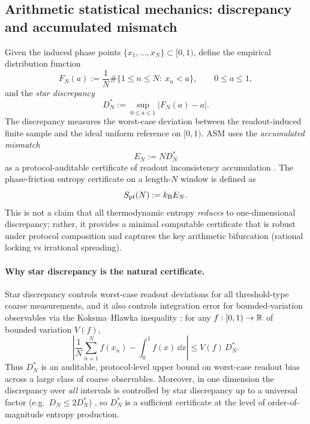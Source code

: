 \subsection{Arithmetic statistical mechanics: discrepancy and accumulated mismatch}
\label{sec:asm_discrepancy}

Given the induced phase points $\{x_1,\dots,x_N\}\subset[0,1)$, define the empirical distribution function
\begin{equation}
  F_N(a) := \frac{1}{N}\#\{1\le n\le N:\ x_n<a\},
  \qquad 0\le a\le 1,
\end{equation}
and the \emph{star discrepancy}
\begin{equation}
  D_N^\ast := \sup_{0\le a\le 1}\bigl|F_N(a)-a\bigr|.
  \label{eq:star_discrepancy_def}
\end{equation}
The discrepancy measures the worst-case deviation between the readout-induced finite sample and the ideal uniform reference on $[0,1)$.
ASM uses the \emph{accumulated mismatch}
\begin{equation}
  E_N := N D_N^\ast
  \label{eq:EN_def}
\end{equation}
as a protocol-auditable certificate of readout inconsistency accumulation \cite{KuipersNiederreiter1974,DrmotaTichy1997,Ma2025HPT}.
The phase-friction entropy certificate on a length-$N$ window is defined as
\begin{equation}
  S_{\mathrm{pf}}(N) := k_{\mathrm{B}} E_N.
  \label{eq:Spf_def}
\end{equation}
This is not a claim that all thermodynamic entropy \emph{reduces} to one-dimensional discrepancy; rather, it provides a minimal computable certificate that is robust under protocol composition and captures the key arithmetic bifurcation (rational locking vs irrational spreading).

\paragraph{Why star discrepancy is the natural certificate.}
Star discrepancy controls worst-case readout deviations for all threshold-type coarse measurements, and it also controls integration error for bounded-variation observables via the Koksma--Hlawka inequality \cite{KuipersNiederreiter1974,DrmotaTichy1997}:
for any $f:[0,1)\to\mathbb{R}$ of bounded variation $V(f)$,
\begin{equation}
  \left|\frac{1}{N}\sum_{n=1}^N f(x_n) - \int_0^1 f(x)\,\dd x\right|
  \le V(f)\,D_N^\ast.
  \label{eq:koksma_hlawka_1d}
\end{equation}
Thus $D_N^\ast$ is an auditable, protocol-level upper bound on worst-case readout bias across a large class of coarse observables.
Moreover, in one dimension the discrepancy over \emph{all} intervals is controlled by star discrepancy up to a universal factor (e.g.\ $D_N \le 2D_N^\ast$) \cite{KuipersNiederreiter1974}, so $D_N^\ast$ is a sufficient certificate at the level of order-of-magnitude entropy production.

